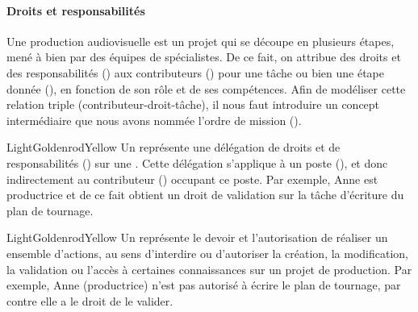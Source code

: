 \paragraph{Droits et responsabilités}
Une production audiovisuelle est un projet qui se découpe en plusieurs étapes, mené à bien par des équipes de spécialistes. 
De ce fait, on attribue des droits et des responsabilités () aux contributeurs () pour une tâche ou bien une étape donnée (), en fonction de son rôle et de ses compétences. 
Afin de modéliser cette relation triple (contributeur-droit-tâche), il nous faut introduire un concept intermédiaire que nous avons nommée l'ordre de mission ().

\begin{cadrecol}{LightGoldenrodYellow}
Un  représente une délégation de droits et de responsabilités () sur une . 
Cette délégation s'applique à un poste (), et donc indirectement au contributeur () occupant ce poste.
Par exemple, Anne est productrice et de ce fait obtient un droit de validation sur la tâche d'écriture du plan de tournage. 
\end{cadrecol}

\begin{cadrecol}{LightGoldenrodYellow}
Un  représente le devoir et l'autorisation de réaliser un ensemble d'actions, au sens d'interdire ou d'autoriser la création, la modification, la validation ou l'accès à certaines connaissances sur un projet de production.
Par exemple, Anne (productrice) n'est pas autorisé à écrire le plan de tournage, par contre elle a le droit de le valider.
\end{cadrecol}

